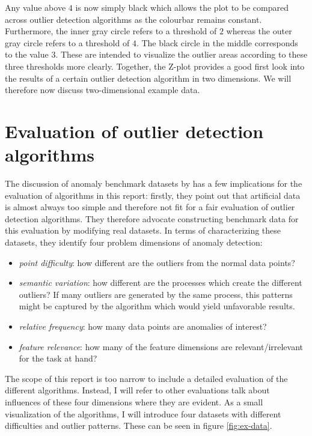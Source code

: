 \documentclass[]{report}
\providecommand{\tightlist}{%
  \setlength{\itemsep}{0pt}\setlength{\parskip}{0pt}}
\theoremstyle{definition}
\theoremstyle{definition}
\theoremstyle{definition}
\theoremstyle{remark}
\begin{document}
Any value above \(4\) is now simply black which allows the plot to be
compared across outlier detection algorithms as the colourbar remains
constant. Furthermore, the inner gray circle refers to a threshold of
\(2\) whereas the outer gray circle refers to a threshold of \(4\). The
black circle in the middle corresponds to the value \(3\). These are
intended to visualize the outlier areas according to these three
thresholds more clearly. Together, the Z-plot provides a good first look
into the results of a certain outlier detection algorithm in two
dimensions. We will therefore now discuss two-dimensional example data.

\hypertarget{evaluation-of-outlier-detection-algorithms}{%
\section{Evaluation of outlier detection
algorithms}\label{evaluation-of-outlier-detection-algorithms}}

The discussion of anomaly benchmark datasets by \citet{Emmott2015} has a
few implications for the evaluation of algorithms in this report:
firstly, they point out that artificial data is almost always too simple
and therefore not fit for a fair evaluation of outlier detection
algorithms. They therefore advocate constructing benchmark data for this
evaluation by modifying real datasets. In terms of characterizing these
datasets, they identify four problem dimensions of anomaly detection:

\begin{itemize}
\tightlist
\item
  \emph{point difficulty}: how different are the outliers from the
  normal data points?
\item
  \emph{semantic variation}: how different are the processes which
  create the different outliers? If many outliers are generated by the
  same process, this patterns might be captured by the algorithm which
  would yield unfavorable results.
\item
  \emph{relative frequency}: how many data points are anomalies of
  interest?
\item
  \emph{feature relevance}: how many of the feature dimensions are
  relevant/irrelevant for the task at hand?
\end{itemize}

The scope of this report is too narrow to include a detailed evaluation
of the different algorithms. Instead, I will refer to other evaluations
talk about influences of these four dimensions where they are evident.
As a small visualization of the algorithms, I will introduce four
datasets with different difficulties and outlier patterns. These can be
seen in figure \ref{fig:ex-data}.
\end{document}
